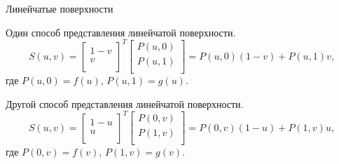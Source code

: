\documentclass{beamer}
\begin{document}
		\begin{frame}{Линейчатые поверхности}

			Один способ представления линейчатой поверхности.
			\[
				S(u,v) = 
				\begin{bmatrix}
					1-v \\
					v \\
				\end{bmatrix}^T
				\begin{bmatrix}
					P(u,0) \\
					P(u,1) \\
				\end{bmatrix}
				=
				P(u,0)(1-v)+P(u,1)v
				,
				\]
				где $P(u,0)=f(u)$, $P(u,1)=g(u)$.
			
				Другой способ представления линейчатой поверхности.
				\[
					S(u,v) = 
					\begin{bmatrix}
						1-u \\
						u \\
					\end{bmatrix}^T
					\begin{bmatrix}
						P(0,v) \\
						P(1,v) \\
					\end{bmatrix}
					=
					P(0,v)(1-u)+P(1,v)u
					,
				\]
				где $P(0,v)=f(v)$, $P(1,v)=g(v)$.
			\end{frame}
\end{document}

